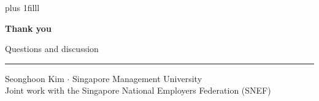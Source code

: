\begin{frame}[plain,label=M-thanks]
  \vskip 0pt plus 1filll
  {\centering
    {\color{Navy}\fontsize{26}{31}\selectfont\bfseries Thank you\par}
    \vspace{0.30cm}
    {\color{Ink}\fontsize{13}{16}\selectfont Questions and discussion\par}
    \vspace{0.40cm}
    {\color{Navy}\rule{3cm}{0.8pt}\par}
    \vspace{0.40cm}
    {\color{Muted}\FsBody Seonghoon Kim $\cdot$ Singapore Management University\\
      Joint work with the Singapore National Employers Federation (SNEF)\par}
  \par}
  \vspace*{0.58cm}
\end{frame}

\appendix
\inbackuptrue

